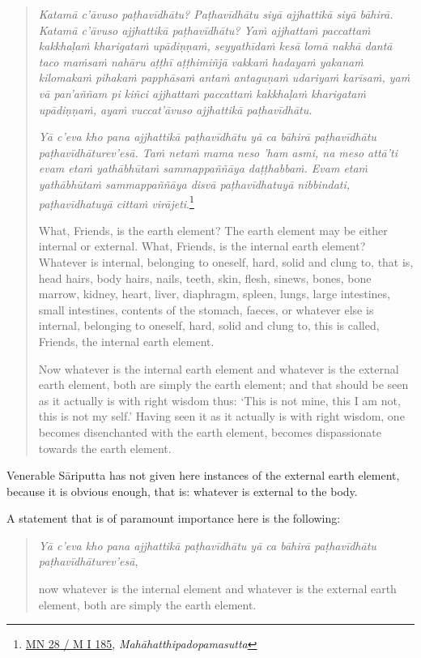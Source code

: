 \begin{quote}
\emph{Katamā c'āvuso paṭhavīdhātu? Paṭhavīdhātu siyā ajjhattikā siyā bāhirā. Katamā c'āvuso ajjhattikā paṭhavīdhātu? Yaṁ ajjhattaṁ paccattaṁ kakkhaḷaṁ kharigataṁ upādiṇṇaṁ, seyyathīdaṁ kesā lomā nakhā dantā taco maṁsaṁ nahāru aṭṭhī aṭṭhimiñjā vakkaṁ hadayaṁ yakanaṁ kilomakaṁ pihakaṁ papphāsaṁ antaṁ antaguṇaṁ udariyaṁ karīsaṁ, yaṁ vā pan'aññam pi kiñci ajjhattaṁ paccattaṁ kakkhaḷaṁ kharigataṁ upādiṇṇaṁ, ayaṁ vuccat'āvuso ajjhattikā paṭhavīdhātu.}

\emph{Yā c'eva kho pana ajjhattikā paṭhavīdhātu yā ca bāhirā paṭhavīdhātu paṭhavīdhāturev'esā. Taṁ netaṁ mama neso 'ham asmi, na meso attā'ti evam etaṁ yathābhūtaṁ sammappaññāya daṭṭhabbaṁ. Evam etaṁ yathābhūtaṁ sammappaññāya disvā paṭhavīdhatuyā nibbindati, paṭhavīdhatuyā cittaṁ virājeti}.\footnote{\href{https://suttacentral.net/mn28/pli/ms}{MN 28 / M I 185}, \emph{Mahāhatthipadopamasutta}}

What, Friends, is the earth element? The earth element may be either internal or external. What, Friends, is the internal earth element? Whatever is internal, belonging to oneself, hard, solid and clung to, that is, head hairs, body hairs, nails, teeth, skin, flesh, sinews, bones, bone marrow, kidney, heart, liver, diaphragm, spleen, lungs, large intestines, small intestines, contents of the stomach, faeces, or whatever else is internal, belonging to oneself, hard, solid and clung to, this is called, Friends, the internal earth element.

Now whatever is the internal earth element and whatever is the external earth element, both are simply the earth element; and that should be seen as it actually is with right wisdom thus: `This is not mine, this I am not, this is not my self.' Having seen it as it actually is with right wisdom, one becomes disenchanted with the earth element, becomes dispassionate towards the earth element.
\end{quote}

Venerable Sāriputta has not given here instances of the external earth element, because it is obvious enough, that is: whatever is external to the body.

A statement that is of paramount importance here is the following:

\begin{quote}
\emph{Yā c'eva kho pana ajjhattikā paṭhavīdhātu yā ca bāhirā paṭhavīdhātu paṭhavīdhāturev'esā},

now whatever is the internal element and whatever is the external earth element, both are simply the earth element.
\end{quote}

